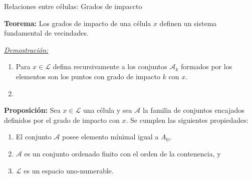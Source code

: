 \documentclass[9pt]{beamer}
\begin{document}
\begin{frame}{Relaciones entre células: Grados de impaccto}

\textbf{Teorema:} Los grados de impacto de una célula $x$ definen un sistema fundamental de vecindades.

\underline{\textit{Demostración:}}
\begin{enumerate}
    \item Para $x\in\mathcal{L}$ defina recursivamente a los conjuntos $\mathcal{A}_k$ formados por los elementos son los puntos con grado de impacto $k$ con $x$.
    \item 
\end{enumerate}

\textbf{Proposición:} Sea $x\in\mathcal{L}$ una célula y sea $\mathcal{A}$ la familia de conjuntos encajados definidos por el grado de impacto con $x$. Se cumplen las siguientes propiedades:
\begin{enumerate}
    \item El conjunto $\mathcal{A}$ posee elemento mínimal igual a $A_0$,
    \item $\mathcal{A}$ es un conjunto ordenado finito con el orden de la contenencia, y
    \item $\mathcal{L}$ es un espacio uno-numerable.
\end{enumerate}

\end{frame}
\end{document}
